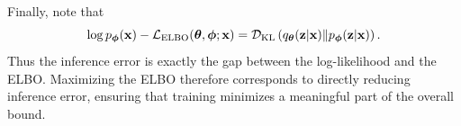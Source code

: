 Finally, note that
\[
\log p_{\bm{\phi}}({\mathbf{x}}) - \mathcal{L}_{\text{ELBO}}(\bm{\theta},\bm{\phi};{\mathbf{x}}) 
= \mathcal{D}_{\mathrm{KL}} \left(q_{\bm{\theta}}({\mathbf{z}}|{\mathbf{x}})\|p_{\bm{\phi}}({\mathbf{z}}|{\mathbf{x}})\right).
\]
Thus the inference error is exactly the gap between the log-likelihood and the ELBO. 
Maximizing the ELBO therefore corresponds to directly reducing inference error, ensuring that training minimizes a meaningful part of the overall bound.












